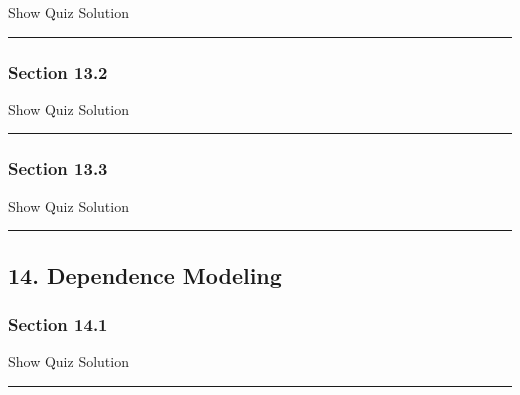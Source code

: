 \documentclass[]{article}
\begin{document}
\hypertarget{surveyResult131}{}

Show Quiz Solution

\hypertarget{display.Quiz131.2}{}
\begin{center}\rule{0.5\linewidth}{\linethickness}\end{center}

\subsubsection{Section 13.2}\label{section-13.2}

\hypertarget{surveyElement132}{}

\hypertarget{surveyResult132}{}

Show Quiz Solution

\hypertarget{display.Quiz132.2}{}
\begin{center}\rule{0.5\linewidth}{\linethickness}\end{center}

\subsubsection{Section 13.3}\label{section-13.3}

\hypertarget{surveyElement133}{}

\hypertarget{surveyResult133}{}

Show Quiz Solution

\hypertarget{display.Quiz133.2}{}
\begin{center}\rule{0.5\linewidth}{\linethickness}\end{center}

\subsection{14. Dependence Modeling}\label{dependence-modeling}

\subsubsection{Section 14.1}\label{section-14.1}

\hypertarget{surveyElement141}{}

\hypertarget{surveyResult141}{}

Show Quiz Solution

\hypertarget{display.Quiz141.2}{}
\begin{center}\rule{0.5\linewidth}{\linethickness}\end{center}
\end{document}
